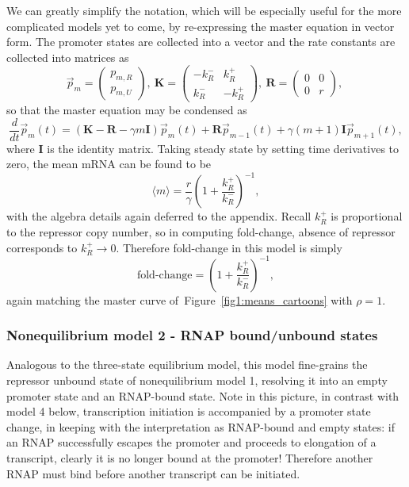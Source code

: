 \documentclass[12pt]{article}%
\newcommand{\vect}[1]{\vec{#1}}
\newcommand{\matr}[1]{\mathbf{#1}}
\newcommand{\deriv}[2][{}]{\frac{d #1}{d #2}}
\newcommand{\fig}[1]{Figure~\ref{#1}}
\begin{document}
We can greatly simplify the notation, which will be especially
useful for the more complicated models yet to come, by
re-expressing the master equation in vector form. The promoter
states are collected into a vector and the rate constants are
collected into matrices as
\begin{equation}
\vect{p}_m = \begin{pmatrix} p_{m,R} \\ p_{m,U} \end{pmatrix},\
\matr{K} = \begin{pmatrix} -k_R^- & k_R^+ \\ k_R^- & -k_R^+ \end{pmatrix},\
\matr{R} = \begin{pmatrix} 0 & 0 \\ 0 & r \end{pmatrix},\
\label{eq:2state_cme_matrices}
\end{equation}
so that the master equation may be condensed as
\begin{equation}
\deriv{t}\vect{p}_m(t) =
\left( \matr{K} - \matr{R} - \gamma m \matr{I} \right) \vect{p}_m(t)
                + \matr{R} \vect{p}_{m-1}(t)
                + \gamma (m+1) \matr{I} \vect{p}_{m+1}(t),
\label{eq:2state_rep_cme}
\end{equation}
where $\matr{I}$ is the identity matrix.
Taking steady state by setting time derivatives to zero,
the mean mRNA can be found to be
\begin{equation}
\langle m \rangle = \frac{r}{\gamma}
        \left(1 + \frac{k_R^+}{k_R^-}\right)^{-1},
\end{equation}
with the algebra details again deferred to the appendix.
Recall $k_R^+$ is proportional to the repressor copy number, so
in computing fold-change, absence of repressor corresponds to
$k_R^+\rightarrow0$.
Therefore fold-change in this model is simply
\begin{equation}
\text{fold-change} = \left(1 + \frac{k_R^+}{k_R^-}\right)^{-1},
\end{equation}
again matching the master curve of~\fig{fig1:means_cartoons} with $\rho=1$.

\subsubsection{Nonequilibrium model 2 - RNAP bound/unbound states}
Analogous to the three-state equilibrium model, this model
fine-grains the repressor unbound state of nonequilibrium model 1,
resolving it into an empty promoter state and an RNAP-bound state.
Note in this picture, in contrast with model 4 below,
transcription initiation is accompanied by a promoter state
change, in keeping with the interpretation as RNAP-bound and
empty states: if an RNAP successfully escapes the promoter and
proceeds to elongation of a transcript, clearly it is no longer
bound at the promoter! Therefore another RNAP must bind before
another transcript can be initiated.
\end{document}
